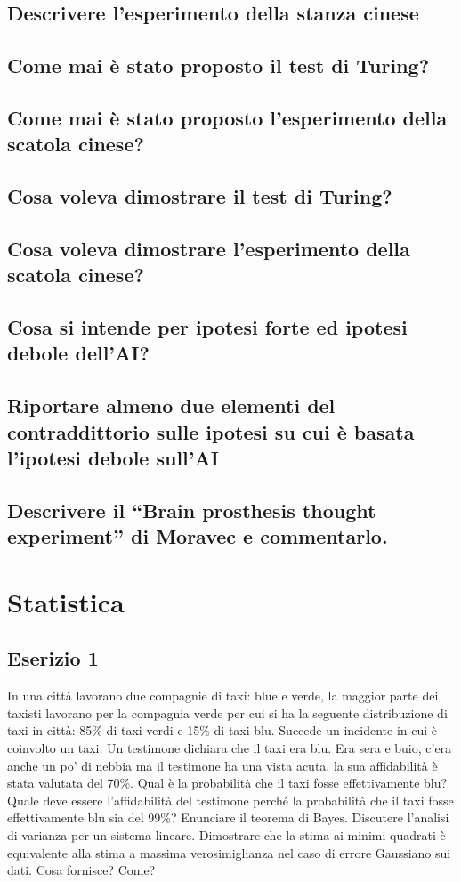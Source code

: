 \documentclass[\main/main.tex]{subfiles}
\begin{document}
\subsection{Descrivere l'esperimento della stanza cinese}
\subsection{Come mai è stato proposto il test di Turing?}
\subsection{Come mai è stato proposto l'esperimento della scatola cinese?}
\subsection{Cosa voleva dimostrare il test di Turing?}
\subsection{Cosa voleva dimostrare l'esperimento della scatola cinese?}
\subsection{Cosa si intende per ipotesi forte ed ipotesi debole dell'AI?}
\subsection{Riportare almeno due elementi del contraddittorio sulle ipotesi su cui è basata l'ipotesi debole sull'AI}
\subsection{Descrivere il “Brain prosthesis thought experiment” di Moravec e commentarlo.}

\section{Statistica}

\subsection{Eserizio 1}
In una città lavorano due compagnie di taxi: blue e verde, la maggior parte dei taxisti lavorano per la compagnia verde per cui si ha la seguente distribuzione di taxi in città: 85\% di taxi verdi e 15\% di taxi blu. Succede un incidente in cui è coinvolto un taxi. Un testimone dichiara che il taxi era blu. Era sera e buio, c'era anche un po' di nebbia ma il testimone ha una vista acuta, la sua affidabilità è stata valutata del 70\%. Qual è la probabilità che il taxi fosse effettivamente blu? Quale deve essere l'affidabilità del testimone perché la probabilità che il taxi fosse effettivamente blu sia del 99\%? Enunciare il teorema di Bayes. Discutere l'analisi di varianza per un sistema lineare. Dimostrare che la stima ai minimi quadrati è equivalente alla stima a massima verosimiglianza nel caso di errore Gaussiano sui dati. Cosa fornisce? Come?
\end{document}
